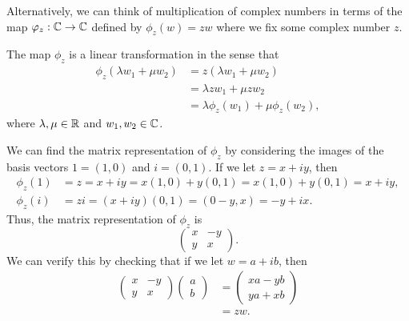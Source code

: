 \begin{example}
    Alternatively, we can think of multiplication of complex numbers in terms of the map \(\varphi_z : \mathbb{C} \to \mathbb{C}\) defined by \(\phi_z(w) = zw\) where we fix some complex number \(z\).

    The map \(\phi_z\) is a linear transformation in the sense that
    \[
        \begin{aligned}
            \phi_z(\lambda w_1 + \mu w_2) &= z(\lambda w_1 + \mu w_2) \\
            &= \lambda zw_1 + \mu zw_2 \\
            &= \lambda \phi_z(w_1) + \mu \phi_z(w_2),
        \end{aligned}
    \]
    where \(\lambda, \mu \in \mathbb{R}\) and \(w_1, w_2 \in \mathbb{C}\).

    We can find the matrix representation of \(\phi_z\) by considering the images of the basis vectors \(1 = (1, 0)\) and \(i = (0, 1)\). If we let \(z = x + iy\), then
    \[
        \begin{aligned}
            \phi_z(1) &= z = x + iy = x(1, 0) + y(0, 1) = x(1, 0) + y(0, 1) = x + iy, \\
            \phi_z(i) &= zi = (x + iy)(0, 1) = (0 - y, x) = -y + ix.
        \end{aligned}
    \]
    Thus, the matrix representation of \(\phi_z\) is
    \[
        \begin{pmatrix}
            x & -y \\
            y & x
        \end{pmatrix}.
    \]
    We can verify this by checking that if we let \(w = a + ib\), then
    \[
        \begin{aligned}
            \begin{pmatrix}
                x & -y \\
                y & x
            \end{pmatrix}
            \begin{pmatrix}
                a \\
                b
            \end{pmatrix}
            &= \begin{pmatrix}
                xa - yb \\
                ya + xb
            \end{pmatrix} \\
            &= zw.
        \end{aligned}
    \]
\end{example}

